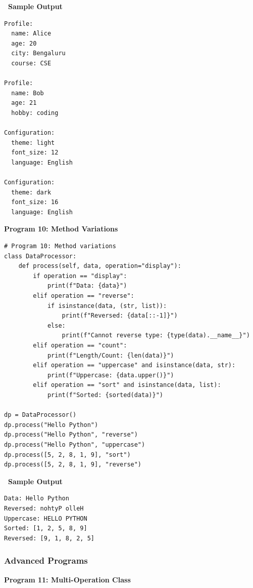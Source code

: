\documentclass[12pt,a4paper]{article}
\newcommand{\outhead}{\noindent\colorbox{cmrgreen!25}%
  {\textbf{\small\color{cmrdark}~Sample Output~}}\par\vspace{-1pt}}
\begin{document}
\outhead
\begin{lstlisting}[style=outputstyle]
Profile:
  name: Alice
  age: 20
  city: Bengaluru
  course: CSE

Profile:
  name: Bob
  age: 21
  hobby: coding

Configuration:
  theme: light
  font_size: 12
  language: English

Configuration:
  theme: dark
  font_size: 16
  language: English
\end{lstlisting}

\vspace{0.5cm}

\textbf{Program 10: Method Variations}

\begin{lstlisting}
# Program 10: Method variations
class DataProcessor:
    def process(self, data, operation="display"):
        if operation == "display":
            print(f"Data: {data}")
        elif operation == "reverse":
            if isinstance(data, (str, list)):
                print(f"Reversed: {data[::-1]}")
            else:
                print(f"Cannot reverse type: {type(data).__name__}")
        elif operation == "count":
            print(f"Length/Count: {len(data)}")
        elif operation == "uppercase" and isinstance(data, str):
            print(f"Uppercase: {data.upper()}")
        elif operation == "sort" and isinstance(data, list):
            print(f"Sorted: {sorted(data)}")

dp = DataProcessor()
dp.process("Hello Python")
dp.process("Hello Python", "reverse")
dp.process("Hello Python", "uppercase")
dp.process([5, 2, 8, 1, 9], "sort")
dp.process([5, 2, 8, 1, 9], "reverse")
\end{lstlisting}

\outhead
\begin{lstlisting}[style=outputstyle]
Data: Hello Python
Reversed: nohtyP olleH
Uppercase: HELLO PYTHON
Sorted: [1, 2, 5, 8, 9]
Reversed: [9, 1, 8, 2, 5]
\end{lstlisting}

\subsubsection{Advanced Programs}

\textbf{Program 11: Multi-Operation Class}
\end{document}
